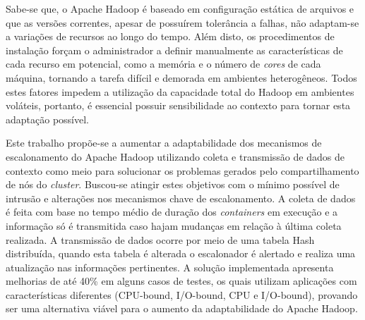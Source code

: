 Sabe-se que, o Apache Hadoop é baseado em configuração estática de arquivos e que as versões correntes, apesar de possuírem tolerância a falhas, não adaptam-se a variações de recursos ao longo do tempo. Além disto, os procedimentos de instalação forçam o administrador a definir manualmente as características de cada recurso em potencial, como a memória e o número de \textit{cores} de cada máquina, tornando a tarefa difícil e demorada em ambientes heterogêneos. Todos estes fatores impedem a utilização da capacidade total do Hadoop em ambientes voláteis, portanto, é essencial possuir sensibilidade ao contexto para tornar esta adaptação possível.

Este trabalho propõe-se a aumentar a adaptabilidade dos mecanismos de escalonamento do Apache Hadoop utilizando coleta e transmissão de dados de contexto como meio para solucionar os problemas gerados pelo compartilhamento de nós do \textit{cluster}. Buscou-se atingir estes objetivos com o mínimo possível de intrusão e alterações nos mecanismos chave de escalonamento. A coleta de dados é feita com base no tempo médio de duração dos \textit{containers} em execução e a informação só é transmitida caso hajam mudanças em relação à última coleta realizada. A transmissão de dados ocorre por meio de uma tabela Hash distribuída, quando esta tabela é alterada o escalonador é alertado e realiza uma atualização nas informações pertinentes. A solução implementada apresenta melhorias de até 40\% em alguns casos de testes, os quais utilizam aplicações com características diferentes (CPU-bound, I/O-bound, CPU e I/O-bound), provando ser uma alternativa viável para o aumento da adaptabilidade do Apache Hadoop.

